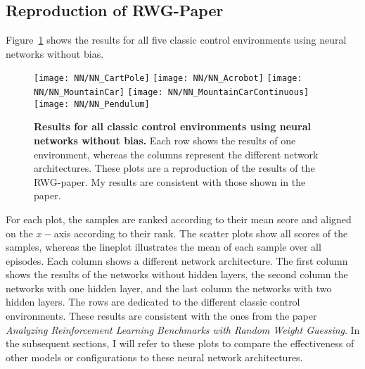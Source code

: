 \subsection{Reproduction of RWG-Paper}
Figure~\ref{fig:results_NN} shows the results for all five classic control environments using neural networks without bias.
\begin{figure}[!ht]
  \centering
  \texttt{[image: NN/NN\_CartPole]}
  \texttt{[image: NN/NN\_Acrobot]}
  \texttt{[image: NN/NN\_MountainCar]}
  \texttt{[image: NN/NN\_MountainCarContinuous]}
  \texttt{[image: NN/NN\_Pendulum]}
\caption[Results for all classic control environments using neural networks without bias]{
  \textbf{Results for all classic control environments using neural networks without bias.}
   Each row shows the results of one environment, whereas the columns represent the different network architectures. These plots are a reproduction of the results of the RWG-paper. My results are consistent with those shown in the paper.
}
\label{fig:results_NN}
\end{figure}
For each plot, the samples are ranked according to their mean score and aligned on the $x-$axis according to their rank. The scatter plots show all scores of the samples, whereas the lineplot illustrates the mean of each sample over all episodes. Each column shows a different network architecture. The first column shows the results of the networks without hidden layers, the second column the networks with one hidden layer, and the last column the networks with two hidden layers. The rows are dedicated to the different classic control environments. These results are consistent with the ones from the paper \emph{Analyzing Reinforcement Learning Benchmarks with Random Weight Guessing}. In the subsequent sections, I will refer to these plots to compare the effectiveness of other models or configurations to these neural network architectures.

